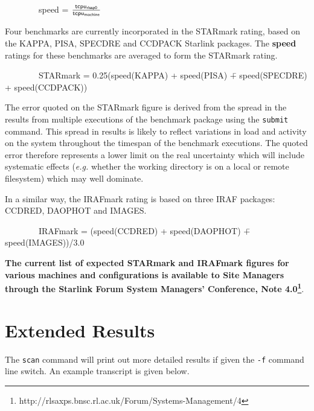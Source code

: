\documentclass[11pt]{article}
\newcommand{\htmladdnormallinkfoot}[2]{#1\footnote{#2}}
\begin{document}
\vspace{5mm}
\begin{large}
~~~~~~~~speed = $\frac{{\sf tcpu_{rlssp0}}}{{\sf tcpu_{machine}}}$
\end{large}
\vspace{5mm}

Four benchmarks are currently incorporated in the STARmark rating,
based on the KAPPA, PISA, SPECDRE and CCDPACK Starlink packages. The
{\bf speed} ratings for these benchmarks are averaged to form the
STARmark rating.

\begin{tabbing}
~~~~~~~~STARmark = 0.25(speed(KAPPA) + speed(PISA) \=+ speed(SPECDRE)  \\
                                                     \>+ speed(CCDPACK))
\end{tabbing}

The error quoted on the STARmark figure is derived from the spread in
the results from multiple executions of the benchmark package using the
{\tt submit} command.  This spread in results is likely to reflect
variations in load and activity on the system throughout the timespan
of the benchmark executions. The quoted error therefore represents a
lower limit on the real uncertainty which will include systematic
effects ({\em e.g.} whether the working directory is on a local or
remote filesystem) which may well dominate.

In a similar way, the IRAFmark rating is based on three IRAF
packages: CCDRED, DAOPHOT and IMAGES.

\begin{tabbing}
~~~~~~~~IRAFmark = (speed(CCDRED) + speed(DAOPHOT) \=+ speed(IMAGES))/3.0  \\
\end{tabbing}


{\bf The current list of expected STARmark and IRAFmark figures for various
machines and configurations is available to Site Managers through the
Starlink Forum System Managers' Conference, \htmladdnormallinkfoot{Note 4.0}{http://rlsaxps.bnsc.rl.ac.uk/Forum/Systems-Management/4}}.


\section{Extended Results}
\label{results}

The {\tt scan} command will print out more detailed results if given
the {\tt -f} command line switch. An example transcript is given below.
\end{document}
